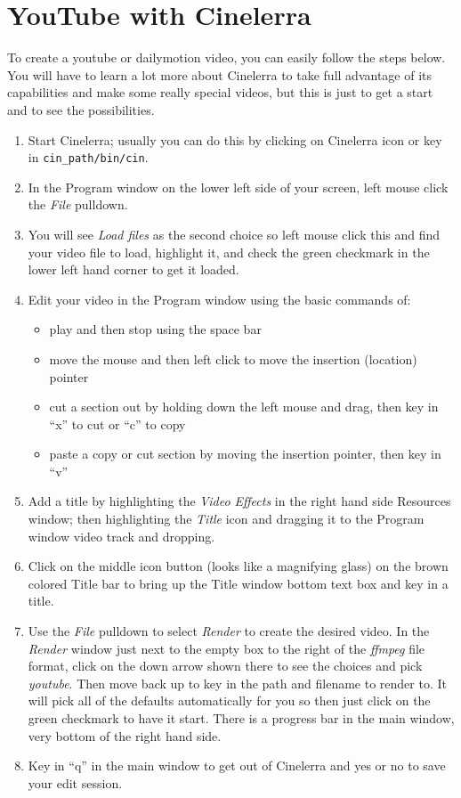 \section{YouTube with Cinelerra}%
\label{sec:youtube_with_cinelerra}

To create a youtube or dailymotion video, you can easily follow the steps below.  You will have to learn a lot more about Cinelerra to take full advantage of its capabilities and make some really special videos, but this is just to get a start and to see the possibilities.

\begin{enumerate}
	\item Start Cinelerra; usually you can do this by clicking on Cinelerra icon or key in \texttt{{cin\_path}/bin/cin}.
	\item In the Program window on the lower left side of your screen, left mouse click the \textit{File} pulldown.
	\item You will see \textit{Load files} as the second choice so left mouse click this and find your video file to
	load, highlight it, and check the green checkmark in the lower left hand corner to get it loaded.
	\item Edit your video in the Program window using the basic commands of:
	\begin{itemize}
		\item play and then stop using the space bar
		\item move the mouse and then left click to move the insertion (location) pointer
		\item cut a section out by holding down the left mouse and drag, then key in “x” to cut or “c” to copy
		\item paste a copy or cut section by moving the insertion pointer, then key in “v”
	\end{itemize}
    \item Add a title by highlighting the \textit{Video Effects} in the right hand side Resources window; then
    highlighting the \textit{Title} icon and dragging it to the Program window video track and dropping.
    \item Click on the middle icon button (looks like a magnifying glass) on the brown colored Title bar to
    bring up the Title window bottom text box and key in a title.
    \item Use the \textit{File} pulldown to select \textit{Render} to create the desired video.  In the \textit{Render} window just next to the empty box to the right of the \textit{ffmpeg} file format, click on the down arrow shown there
    to see the choices and pick \textit{youtube}.  Then move back up to key in the path and filename to render
    to.  It will pick all of the defaults automatically for you so then just click on the green checkmark to
    have it start.  There is a progress bar in the main window, very bottom of the right hand side.
    \item Key in “q” in the main window to get out of Cinelerra and yes or no to save your edit session.
\end{enumerate}

